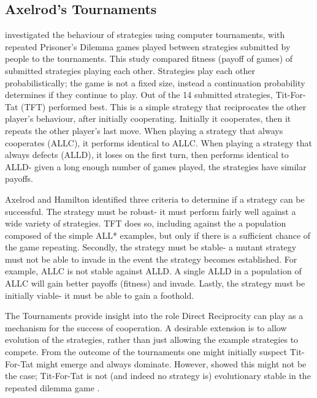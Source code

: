 \documentclass[a4paper,11pt,bcshonoursthesis,singlespace,twoside,thesisdraft,pdflatex]{cssethesis}
\begin{document}
\subsection{Axelrod's Tournaments}
\citet{axelrod:Science:1981} investigated the behaviour of strategies using computer tournaments, with repeated Prisoner's Dilemma games played between strategies submitted by people to the tournaments. 
This study compared fitness (payoff of games) of submitted strategies playing each other. 
Strategies play each other probabilistically; the game is not a fixed size, instead a continuation probability determines if they continue to play. Out of the 14 submitted strategies, Tit-For-Tat (TFT) performed best. 
This is a simple strategy that reciprocates the other player's behaviour, after initially cooperating. 
Initially it cooperates, then it repeats the other player's last move. 
When playing a strategy that always cooperates (ALLC), it performs identical to ALLC. 
When playing a strategy that always defects (ALLD), it loses on the first turn, then performs identical to ALLD- given a long enough number of games played, the strategies have similar payoffs. 

Axelrod and Hamilton identified three criteria to determine if a strategy can be successful. The strategy must be robust- it must perform fairly well against a wide variety of strategies. TFT does so, including against the a population composed of the simple ALL* examples, but only if there is a sufficient chance of the game repeating. Secondly, the strategy must be stable- a mutant strategy must not be able to invade in the event the strategy becomes established. For example, ALLC is not stable against ALLD. 
A single ALLD in a population of ALLC will gain better payoffs (fitness) and invade. 
Lastly, the strategy must be initially viable- it must be able to gain a foothold. 

The Tournaments provide insight into the role Direct Reciprocity can play as a mechanism for the success of cooperation. 
A desirable extension is to allow evolution of the strategies, rather than just allowing the example strategies to compete. 
From the outcome of the tournaments one might initially suspect Tit-For-Tat might emerge and always dominate. However, \citet{boyd1987no} showed this might not be the case; Tit-For-Tat is not (and indeed no strategy is) evolutionary stable in the repeated dilemma game \citep{boyd1987no, van2010and}. 
\end{document}
